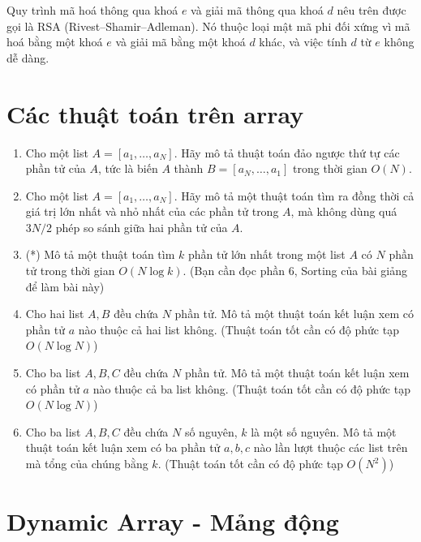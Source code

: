 \documentclass{article}
\begin{document}
Quy trình mã hoá thông qua khoá $e$ và giải mã thông qua khoá $d$ nêu trên được gọi là RSA (Rivest–Shamir–Adleman). Nó thuộc loại mật mã phi đối xứng vì mã hoá bằng một khoá $e$ và giải mã bằng một khoá $d$ khác, và việc tính $d$ từ $e$ không dễ dàng.

\section{Các thuật toán trên array}

\begin{em}
    \begin{enumerate}
        \item Cho một list $A = [a_1, \ldots, a_N]$. Hãy mô tả thuật toán đảo ngược thứ tự các phần tử của $A$, tức là biến $A$ thành $B = [a_N, \ldots, a_1]$ trong thời gian $O(N)$.
        \item Cho một list $A = [a_1, \ldots, a_N]$. Hãy mô tả một thuật toán tìm ra đồng thời cả giá trị lớn nhất và nhỏ nhất của các phần tử trong $A$, mà không dùng quá $3N/2$ phép so sánh giữa hai phần tử của $A$.
        \item (*) Mô tả một thuật toán tìm $k$ phần tử lớn nhất trong một list $A$ có $N$ phần tử trong thời gian $O(N\log k)$. (Bạn cần đọc phần 6, Sorting của bài giảng để làm bài này)
        \item Cho hai list $A, B$ đều chứa $N$ phần tử. Mô tả một thuật toán kết luận xem có phần tử $a$ nào thuộc cả hai list không. (Thuật toán tốt cần có độ phức tạp $O(N \log N)$)
        \item Cho ba list $A, B, C$ đều chứa $N$ phần tử. Mô tả một thuật toán kết luận xem có phần tử $a$ nào thuộc cả ba list không. (Thuật toán tốt cần có độ phức tạp $O(N \log N)$)
        \item Cho ba list $A, B, C$ đều chứa $N$ số nguyên, $k$ là một số nguyên. Mô tả một thuật toán kết luận xem có ba phần tử $a, b, c$ nào lần lượt thuộc các list trên mà tổng của chúng bằng $k$. (Thuật toán tốt cần có độ phức tạp $O(N^2)$)
    \end{enumerate}
\end{em}


\section{Dynamic Array - Mảng động}
\end{document}
